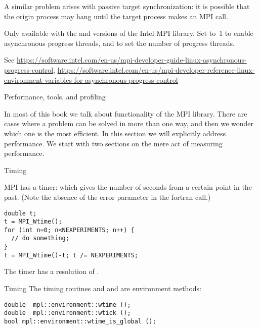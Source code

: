 A similar problem arises with passive target synchronization:
it is possible that the origin process may hang until 
the target process makes an MPI call.

\begin{intelnote}
  Only available with the 
  and  versions of the Intel MPI library.
  Set  to~1 to enable asynchronous progress threads,
  and  to set the number of progress threads.

  See \url{https://software.intel.com/en-us/mpi-developer-guide-linux-asynchronous-progress-control},
  \url{https://software.intel.com/en-us/mpi-developer-reference-linux-environment-variables-for-asynchronous-progress-control}
\end{intelnote}

 {Performance, tools, and profiling}
\label{sec:mpi-performance}

In most of this book we talk about functionality of the MPI
library. There are cases where a problem can be solved in more than
one way, and then we wonder which one is the most efficient. In this
section we will explicitly address performance. We start with two
sections on the mere act of measuring performance.

 {Timing}
\label{sec:mpi-timing}

MPI has a  timer: 
which gives the number of seconds from a certain point in the past.
(Note the absence of the error parameter in the fortran call.)
%
\begin{lstlisting}
double t;
t = MPI_Wtime();
for (int n=0; n<NEXPERIMENTS; n++) {
  // do something;
}
t = MPI_Wtime()-t; t /= NEXPERIMENTS;
\end{lstlisting}

The timer has a resolution of .

\begin{mplnote}{Timing}
  The timing routines  and 
  and 
  are environment methods:
\begin{lstlisting}
double 	mpl::environment::wtime ();
double 	mpl::environment::wtick ();
bool mpl::environment::wtime_is_global ();
\end{lstlisting}
\end{mplnote}

